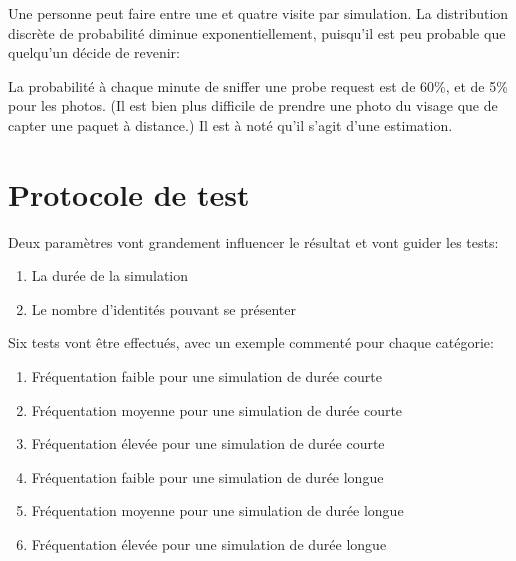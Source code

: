
Une personne peut faire entre une et quatre visite par simulation.
La distribution discrète de probabilité diminue exponentiellement, puisqu'il est peu probable que quelqu'un décide de revenir:


La probabilité à chaque minute de sniffer une probe request est de 60\%, et de 5\% pour les photos. (Il est bien plus difficile de prendre une photo du visage que de 
capter une paquet à distance.) Il est à noté qu'il s'agit d'une estimation.

\section{Protocole de test}
Deux paramètres vont grandement influencer le résultat et vont guider les tests:
\begin{enumerate}
    \item La durée de la simulation
    \item Le nombre d'identités pouvant se présenter
\end{enumerate}

Six tests vont être effectués, avec un exemple commenté pour chaque catégorie: 
\begin{enumerate}
    \item Fréquentation faible pour une simulation de durée courte
    \item Fréquentation moyenne pour une simulation de durée courte
    \item Fréquentation élevée pour une simulation de durée courte
    \item Fréquentation faible pour une simulation de durée longue
    \item Fréquentation moyenne pour une simulation de durée longue
    \item Fréquentation élevée pour une simulation de durée longue
\end{enumerate}

